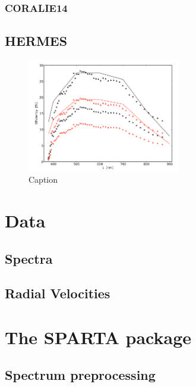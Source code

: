             \subsubsection{CORALIE14}
        \subsection{HERMES}
        \begin{figure}[H]
        \centering
        \includegraphics[width=0.6\textwidth]{report/images/chap3_methods/efficiency_hermes.png}
        \caption{Caption}
        \label{3.1c}
        \end{figure}
    \section{Data}
    \subsection{Spectra}
    \subsection{Radial Velocities}
    \section{The SPARTA package}
    \subsection{Spectrum preprocessing}

